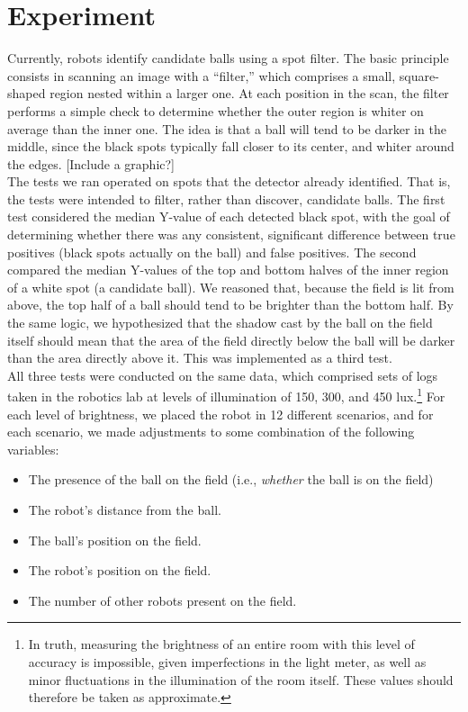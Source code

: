 \documentclass[11pt, twocolumn]{article}
\begin{document}
\section{Experiment}
Currently, robots identify candidate balls using a spot filter. The basic principle consists in scanning an image with a ``filter,'' which comprises a small, square-shaped region nested within a larger one. At each position in the scan, the filter performs a simple check to determine whether the outer region is whiter on average than the inner one. The idea is that a ball will tend to be darker in the middle, since the black spots typically fall closer to its center, and whiter around the edges. [Include a graphic?] \\
\indent The tests we ran operated on spots that the detector already identified. That is, the tests were intended to filter, rather than discover, candidate balls. The first test considered the median Y-value of each detected black spot, with the goal of determining whether there was any consistent, significant difference between true positives (black spots actually on the ball) and false positives. The second compared the median Y-values of the top and bottom halves of the inner region of a white spot (a candidate ball). We reasoned that, because the field is lit from above, the top half of a ball should tend to be brighter than the bottom half. By the same logic, we hypothesized that the shadow cast by the ball on the field itself should mean that the area of the field directly below the ball will be darker than the area directly above it. This was implemented as a third test. \\
\indent All three tests were conducted on the same data, which comprised sets of logs taken in the robotics lab at levels of illumination of 150, 300, and 450 lux.\footnote{In truth, measuring the brightness of an entire room with this level of accuracy is impossible, given imperfections in the light meter, as well as minor fluctuations in the illumination of the room itself. These values should therefore be taken as approximate.} For each level of brightness, we placed the robot in 12 different scenarios, and for each scenario, we made adjustments to some combination of the following variables:
\begin{itemize}
\item The presence of the ball on the field (i.e., \emph{whether} the ball is on the field)
\item The robot's distance from the ball.
\item The ball's position on the field.
\item The robot's position on the field.
\item The number of other robots present on the field.
\end{itemize}
\end{document}
